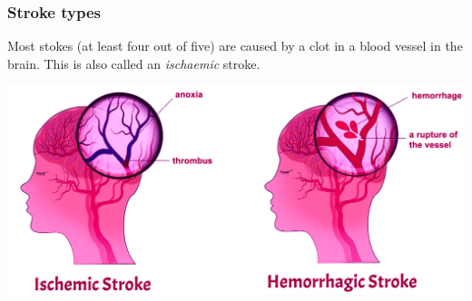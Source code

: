 \begin{frame}
\frametitle{Stroke types}

Most stokes (at least four out of five) are caused by a clot in a blood vessel in the brain. This is also called an \emph{ischaemic} stroke.

\vspace{3mm}



\begin{center}
\includegraphics[width=1.0\textwidth]{./images/stroke_types}
\end{center}


\end{frame}